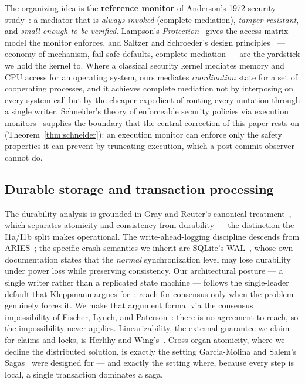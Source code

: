 \documentclass[11pt,a4paper]{article}
\theoremstyle{definition}
\theoremstyle{remark}
\begin{document}
The organizing idea is the \textbf{reference monitor} of Anderson's 1972 security
study~\cite{anderson1972}: a mediator that is \emph{always invoked} (complete
mediation), \emph{tamper-resistant}, and \emph{small enough to be verified}.
Lampson's \emph{Protection}~\cite{lampson1974} gives the access-matrix model the
monitor enforces, and Saltzer and Schroeder's design
principles~\cite{saltzer1975protection} --- economy of mechanism, fail-safe
defaults, complete mediation --- are the yardstick we hold the kernel to. Where a
classical security kernel mediates memory and CPU access for an operating system,
ours mediates \emph{coordination} state for a set of cooperating processes, and it
achieves complete mediation not by interposing on every system call but by the
cheaper expedient of routing every mutation through a single writer. Schneider's
theory of enforceable security policies via execution monitors~\cite{schneider2000}
supplies the boundary that the central correction of this paper rests on
(Theorem~\ref{thm:schneider}): an execution monitor can enforce only the safety
properties it can prevent by truncating execution, which a post-commit observer
cannot do.

\subsection{Durable storage and transaction processing}

The durability analysis is grounded in Gray and Reuter's canonical
treatment~\cite{grayreuter1992}, which separates atomicity and consistency from
durability --- the distinction the I1a/I1b split makes operational. The
write-ahead-logging discipline descends from ARIES~\cite{mohan1992aries}; the
specific crash semantics we inherit are SQLite's WAL~\cite{sqlitewal}, whose own
documentation states that the \emph{normal} synchronization level may lose
durability under power loss while preserving consistency. Our architectural posture
--- a single writer rather than a replicated state machine --- follows the
single-leader default that Kleppmann argues for~\cite{kleppmann2017}: reach for
consensus only when the problem genuinely forces it. We make that argument formal
via the consensus impossibility of Fischer, Lynch, and
Paterson~\cite{flp1985}: there is no agreement to reach, so the impossibility never
applies. Linearizability, the external guarantee we claim for claims and locks, is
Herlihy and Wing's~\cite{herlihywing1990}. Cross-organ atomicity, where we decline
the distributed solution, is exactly the setting Garcia-Molina and Salem's
Sagas~\cite{garciamolina1987} were designed for --- and exactly the setting where,
because every step is local, a single transaction dominates a saga.
\end{document}
